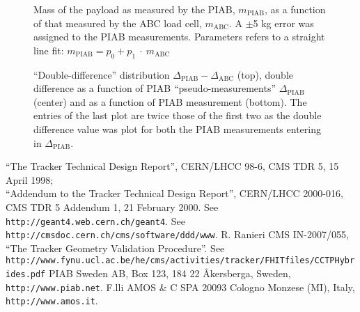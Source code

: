 \documentclass{cmspaper}
\begin{document}
\begin{figure}[hbtp]
  \begin{center}
    \caption{Mass of the payload as measured by the PIAB, $m_{\mathrm{PIAB}}$, as a function
    of that measured by the ABC load cell,
    $m_{\mathrm{ABC}}$. A $\pm$5 kg error was assigned to the PIAB
    measurements. Parameters refers to a straight line fit:
    $m_{\mathrm{PIAB}} =p_0 + p_1~\cdot~m_{\mathrm{ABC}}$}
    \label{fig:calib_line}
  \end{center}
\end{figure}


\begin{figure}[hbtp]
  \begin{center}
    \caption{``Double-difference'' distribution
      $\Delta_{\mathrm{PIAB}}-\Delta_{\mathrm{ABC}}$ (top), double
      difference as a function of PIAB ``pseudo-measurements''
      $\Delta_{\mathrm{PIAB}}$ (center)
      and as a function of PIAB measurement (bottom). The entries of the
      last plot are twice those of the first two as the double
      difference value was plot for both the PIAB measurements
      entering in $\Delta_{\mathrm{PIAB}}$.
    }
    \label{fig:calib_delta}
  \end{center}
\end{figure}

\begin{thebibliography}{99}
 ``The Tracker Technical Design Report'',             CERN/LHCC 98-6, CMS TDR 5, 15 April 1998;\\
 ``Addendum to the Tracker Technical Design Report'', CERN/LHCC 2000-016, CMS TDR 5 Addendum 1, 21 February 2000.
  See {\tt http://geant4.web.cern.ch/geant4}.
  See {\tt http://cmsdoc.cern.ch/cms/software/ddd/www}.
  R. Ranieri CMS IN-2007/055, ``The Tracker Geometry Validation Procedure''.
 See {\tt http://www.fynu.ucl.ac.be/he/cms/activities/tracker/FHITfiles/CCTPHybrides.pdf}
  PIAB Sweden AB, Box 123, 184 22 \AA kersberga, Sweden, 
  {\tt http://www.piab.net}.
  F.lli AMOS \& C SPA 20093 Cologno Monzese (MI), Italy,
  {\tt http://www.amos.it}.
\end{thebibliography}
\end{document}
